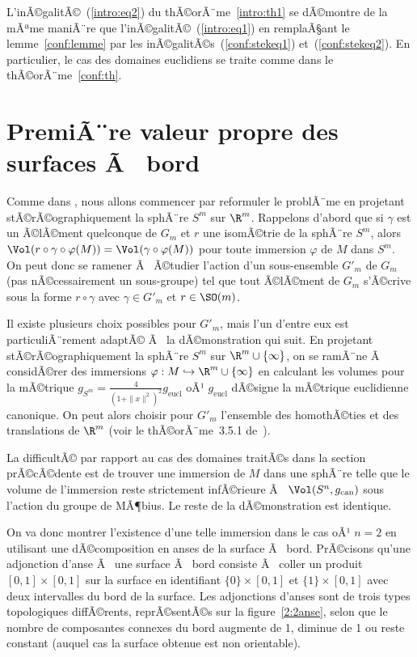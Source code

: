 \documentclass[11pt,a4paper]{smfart}
\begin{document}
\begin{rema}\label{conf:stekrem}
L'inÃ©galitÃ©~(\ref{intro:eq2}) du thÃ©orÃ¨me~\ref{intro:th1}
se dÃ©montre de la mÃªme maniÃ¨re que l'inÃ©galitÃ©~(\ref{intro:eq1}) en remplaÃ§ant
le lemme~\ref{conf:lemme} par les inÃ©galitÃ©s~(\ref{conf:stekeq1})
et~(\ref{conf:stekeq2}). En particulier, le cas des domaines euclidiens
se traite comme dans le thÃ©orÃ¨me~\ref{conf:th}.
\end{rema}

\section{PremiÃ¨re valeur propre des surfaces Ã  bord}\label{2}

Comme dans \cite{ja08}, nous allons commencer par reformuler le problÃ¨me
en projetant stÃ©rÃ©ographiquement la sphÃ¨re $S^m$ sur $\R^m$.
Rappelons d'abord que si $\gamma$ est un Ã©lÃ©ment quelconque de $G_m$ et
$r$ une isomÃ©trie de la sphÃ¨re $S^m$, alors $\Vol(r\circ\gamma\circ\varphi
(M))=\Vol(\gamma\circ\varphi(M))$ pour toute immersion $\varphi$ de $M$
dans $S^m$. On peut donc se ramener Ã  Ã©tudier l'action d'un sous-ensemble
$G'_m$ de $G_m$ (pas nÃ©cessairement un
sous-groupe) tel que tout Ã©lÃ©ment de $G_m$ s'Ã©crive sous la forme
$r\circ\gamma$ avec $\gamma\in G'_m$ et $r\in\SO(m)$.

Il existe plusieurs choix possibles pour $G'_m$, mais l'un d'entre
eux est particuliÃ¨rement adaptÃ© Ã  la dÃ©monstration qui suit. En projetant
stÃ©rÃ©ographiquement la sphÃ¨re $S^m$ sur $\R^m\cup\{\infty\}$, on se
ramÃ¨ne Ã  considÃ©rer des immersions $\varphi:M\hookrightarrow
\R^m\cup\{\infty\}$ en calculant les volumes pour la mÃ©trique
$g_{S^m}=\frac4{(1+\|x\|^2)^2}g_{\mathrm{eucl}}$ oÃ¹ $g_{\mathrm{eucl}}$
dÃ©signe la mÃ©trique euclidienne canonique. On peut alors choisir
pour $G'_m$ l'ensemble des homothÃ©ties et des translations de
$\R^m$ (voir le thÃ©orÃ¨me~3.5.1 de~\cite{be83}).

La difficultÃ© par rapport au cas des domaines traitÃ©s dans la section prÃ©cÃ©dente
est de trouver une immersion de $M$ dans une sphÃ¨re telle que le volume
de l'immersion
reste strictement infÃ©rieure Ã  $\Vol(S^n,g_{\textrm{can}})$ sous
l'action du groupe de MÃ¶bius. Le reste de la dÃ©monstration est identique.

On va donc montrer l'existence d'une telle immersion dans le cas oÃ¹ $n=2$
en utilisant une dÃ©composition en anses de la surface Ã  bord. PrÃ©cisons
qu'une adjonction d'anse Ã  une surface Ã  bord consiste Ã  coller un
produit $[0,1]\times[0,1]$ sur la surface en identifiant $\{0\}\times[0,1]$
et $\{1\}\times[0,1]$ avec deux intervalles du bord de la surface. Les
adjonctions d'anses sont de trois types topologiques diffÃ©rents,
reprÃ©sentÃ©s sur la figure~\ref{2:2anse}, selon que le nombre
de composantes connexes du bord augmente de 1, diminue de 1 ou reste constant
(auquel cas la surface obtenue est non orientable).
\end{document}
